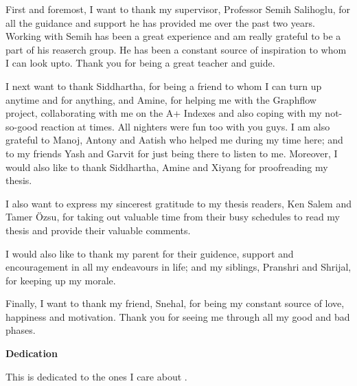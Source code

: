 First and foremost, I want to thank my supervisor, Professor Semih Salihoglu, for all the guidance and support he has provided me over the past two years. Working with Semih has been a great experience and am really grateful to be a part of his reaserch group. He has been a constant source of inspiration to whom I can look upto. Thank you for being a great teacher and guide.

I next want to thank Siddhartha, for being a friend to whom I can turn up anytime and for anything, and Amine, for helping me with the Graphflow project, collaborating with me on the A+ Indexes and also coping with my not-so-good reaction at times. All nighters were fun too with you guys. I am also grateful to Manoj, Antony and Aatish who helped me during my time here; and to my friends Yash and Garvit for just being there to listen to me. Moreover, I would also like to thank Siddhartha, Amine and Xiyang for proofreading my thesis.

I also want to express my sincerest gratitude to my thesis readers, Ken Salem and Tamer Özsu, for taking out valuable time from their busy schedules to read my thesis and provide their valuable comments. 

I would also like to thank my parent for their guidence, support and encouragement in all my endeavours in life; and my siblings, Pranshri and Shrijal, for keeping up my morale. 

Finally, I want to thank my friend, Snehal, for being my constant source of love, happiness and motivation. Thank you for seeing me through all my good and bad phases. 

\cleardoublepage


\begin{center}\textbf{Dedication}\end{center}

This is dedicated to the ones I care about .
\cleardoublepage

\renewcommand\contentsname{Table of Contents}
\tableofcontents
\cleardoublepage
{}    %

\listoftables
\cleardoublepage
{}		%

\listoffigures
\cleardoublepage
{}		%

\printglossaries
\cleardoublepage
{}		%


